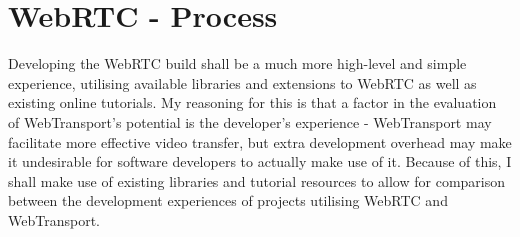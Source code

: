 \section{WebRTC - Process}
Developing the WebRTC build shall be a much more high-level and simple experience, utilising available libraries and extensions to WebRTC as well as existing online tutorials. My reasoning for this is that a factor in the evaluation of WebTransport's potential is the developer's experience - WebTransport may facilitate more effective video transfer, but extra development overhead may make it undesirable for software developers to actually make use of it. Because of this, I shall make use of existing libraries and tutorial resources to allow for comparison between the development experiences of projects utilising WebRTC and WebTransport.




